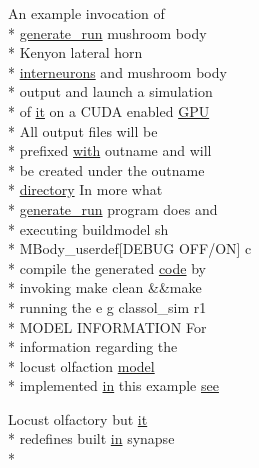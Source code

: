 \begin{DoxyCompactItemize}
An example invocation of \\*
\hyperlink{userproject_2MBody__userdef__project_2README_8txt_a320a215d1e27b4de394be70e90d22863}{generate\+\_\+run} mushroom body \\*
Kenyon lateral horn \\*
\hyperlink{userproject_2SynDelay__project_2README_8txt_adf6327d22e2c11a62a22ab5afd4f2b81}{interneurons} and mushroom body \\*
output and launch a simulation \\*
of \hyperlink{userproject_2PoissonIzh__project_2README_8txt_a3e3bbb6c9b14c38757cf273a117e43e8}{it} on a C\+U\+D\+A enabled \hyperlink{modelSpec_8h_a39cb9803524b6f3b783344b2f89867b4}{G\+P\+U} \\*
All output files will be \\*
prefixed \hyperlink{userproject_2OneComp__project_2README_8txt_ace09bb40fbf4457ad9a9340a67a4fa9a}{with} outname and will \\*
be created under the outname \\*
\hyperlink{README_8txt_ae619b68020535fba5ac79522a0d9d1c4}{directory} In more what \\*
\hyperlink{userproject_2MBody__userdef__project_2README_8txt_a320a215d1e27b4de394be70e90d22863}{generate\+\_\+run} program does and \\*
executing buildmodel sh \\*
M\+Body\+\_\+userdef\mbox{[}D\+E\+B\+U\+G O\+F\+F/O\+N\mbox{]} c \\*
compile the generated \hyperlink{userproject_2MBody__userdef__project_2README_8txt_aeec4e596748e7c29dd5548dae4c70685}{code} by \\*
invoking make clean \&\&make \\*
running the e g classol\+\_\+sim r1 \\*
M\+O\+D\+E\+L I\+N\+F\+O\+R\+M\+A\+T\+I\+O\+N For \\*
information regarding the \\*
locust olfaction \hyperlink{README_8txt_a69fd801b7213948c12d9dd7eebb3ed14}{model} \\*
implemented \hyperlink{README_8txt_a148897a6b2cc9cff25af80abb13426b0}{in} this example \hyperlink{userproject_2MBody__userdef__project_2README_8txt_abf32849f9c3ee45276ee0d4aa4c07e0b}{see}
\item 
Locust olfactory but \hyperlink{userproject_2PoissonIzh__project_2README_8txt_a3e3bbb6c9b14c38757cf273a117e43e8}{it} \\*
redefines built \hyperlink{README_8txt_a148897a6b2cc9cff25af80abb13426b0}{in} synapse \\*

\end{DoxyCompactItemize}
